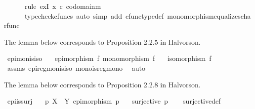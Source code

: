 \begin{isabellebody}
\ \ \ \ \ \ rule\ exI{\isacharbrackleft}{\kern0pt}\ x{\isacharequal}{\kern0pt}{\isachardoublequoteopen}{\isasymt}\ {\isasymcirc}\isactrlsub c\ {\isasymbeta}\isactrlbsub codomain{\isacharparenleft}{\kern0pt}m{\isacharparenright}{\kern0pt}\isactrlesub {\isachardoublequoteclose}{\isacharbrackright}{\kern0pt}{\isacharcomma}{\kern0pt}\ \isanewline
\ \ \ \ \ \ typecheck{\isacharunderscore}{\kern0pt}cfuncs{\isacharcomma}{\kern0pt}\ auto\ simp\ add{\isacharcolon}{\kern0pt}\ cfunc{\isacharunderscore}{\kern0pt}type{\isacharunderscore}{\kern0pt}def\ monomorphism{\isacharunderscore}{\kern0pt}equalizes{\isacharunderscore}{\kern0pt}char{\isacharunderscore}{\kern0pt}func{\isacharparenright}{\kern0pt}%
\endisatagproof
{\isafoldproof}%
%
\isadelimproof
%
\endisadelimproof
%
\begin{isamarkuptext}%
The lemma below corresponds to Proposition 2.2.5 in Halvorson.%
\end{isamarkuptext}\isamarkuptrue%
\isamarkupfalse%
\ epi{\isacharunderscore}{\kern0pt}mon{\isacharunderscore}{\kern0pt}is{\isacharunderscore}{\kern0pt}iso{\isacharcolon}{\kern0pt}\isanewline
\ \ \ {\isachardoublequoteopen}epimorphism\ f{\isachardoublequoteclose}\ {\isachardoublequoteopen}monomorphism\ f{\isachardoublequoteclose}\isanewline
\ \ \ {\isachardoublequoteopen}isomorphism\ f{\isachardoublequoteclose}\isanewline
%
\isadelimproof
\ \ %
\endisadelimproof
%
\isatagproof
{}\isamarkupfalse%
\ assms\ epi{\isacharunderscore}{\kern0pt}regmon{\isacharunderscore}{\kern0pt}is{\isacharunderscore}{\kern0pt}iso\ mono{\isacharunderscore}{\kern0pt}is{\isacharunderscore}{\kern0pt}regmono\ \isamarkupfalse%
\ auto%
\endisatagproof
{\isafoldproof}%
%
\isadelimproof
%
\endisadelimproof
%
\begin{isamarkuptext}%
The lemma below corresponds to Proposition 2.2.8 in Halvorson.%
\end{isamarkuptext}\isamarkuptrue%
\isamarkupfalse%
\ epi{\isacharunderscore}{\kern0pt}is{\isacharunderscore}{\kern0pt}surj{\isacharcolon}{\kern0pt}\isanewline
\ \ \ {\isachardoublequoteopen}p{\isacharcolon}{\kern0pt}\ X\ {\isasymrightarrow}\ Y{\isachardoublequoteclose}\ {\isachardoublequoteopen}epimorphism\ p{\isachardoublequoteclose}\isanewline
\ \ \ {\isachardoublequoteopen}surjective\ p{\isachardoublequoteclose}\isanewline
%
\isadelimproof
\ \ %
\endisadelimproof
%
\isatagproof
{}\isamarkupfalse%
\ surjective{\isacharunderscore}{\kern0pt}def\isanewline

\end{isabellebody}
